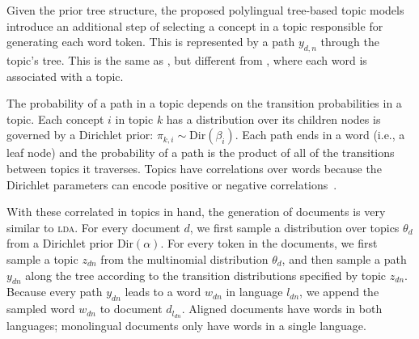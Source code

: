 Given the prior tree structure, the proposed polylingual tree-based topic models introduce an additional step of selecting a concept in a topic responsible for generating each word token. This is represented by a path $y_{d,n}$ through the topic's tree. This is the same as \tlda{}, but different from , where each word is associated with a topic.



The probability of a path in a topic depends on the transition probabilities in a topic.  Each concept $i$ in topic $k$ has a distribution over its children nodes is governed by a Dirichlet prior: $\pi_{k,i} \sim \text{Dir}(\beta_{i})$.  Each path ends in a word (i.e., a leaf node) and the probability of a path is the product of all of the transitions between topics it traverses. Topics have correlations over words because the Dirichlet parameters can encode positive or negative correlations~\citep{andrzejewski-09}.


With these correlated in topics in hand, the generation of documents is very similar to \textsc{lda}.  For every document $d$, we first sample a distribution over topics $\theta_d$ from a Dirichlet prior $\text{Dir}(\alpha)$.  For every token in the documents, we first sample a topic $z_{dn}$ from the multinomial distribution $\theta_d$, and then sample a path $y_{dn}$ along the tree according to the transition distributions specified by topic $z_{dn}$.  Because every path $y_{dn}$ leads to a word $w_{dn}$ in language $l_{dn}$, we append the sampled word $w_{dn}$ to document $d_{l_{dn}}$.  Aligned documents have words in both languages; monolingual documents only have words in a single language.

